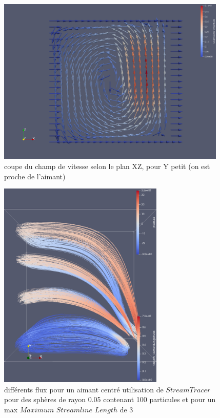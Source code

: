 \documentclass[a4paper,12pt,titlepage]{report}
\begin{document}
\begin{onehalfspace}
\begin{figure}[!h]
\begin{center} 
\includegraphics[height = 8cm, keepaspectratio]{graphes/Paraview/coupe_aimant_decentre.png} 
\caption{\label{figure 35}coupe du champ de vitesse selon le plan XZ, pour Y petit (on est proche de l'aimant)}
\end{center}
\end{figure}


\begin{figure}[!h]
\begin{center} 
\includegraphics[height = 10cm, keepaspectratio]{graphes/Paraview/differents_flux_decentre_100pt_lenght4_rad05.png} 
\caption{\label{figure 36 }  différents flux pour un aimant centré utilisation de $StreamTracer$pour des sphères de rayon 0.05 contenant 100 particules et pour un max $Maximum$ $Streamline$ $Length$  de 3}
\end{center}
\end{figure}


\end{onehalfspace}
\end{document}
